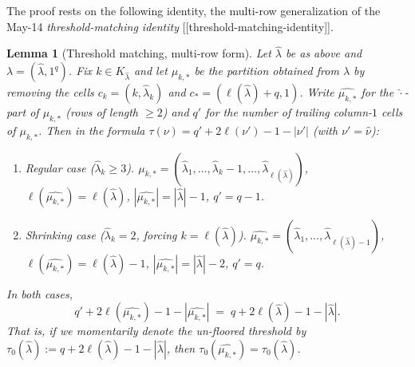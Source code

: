 \documentclass[11pt]{article}
\newtheorem{lemma}[theorem]{Lemma}
\theoremstyle{definition}
\newcommand{\hatl}{\widehat\lambda}
\newcommand{\elh}{\ell(\hatl)}
\begin{document}
The proof rests on the following identity, the multi-row generalization
of the May-14 \emph{threshold-matching identity}
[[threshold-matching-identity]].

\begin{lemma}[Threshold matching, multi-row form]\label{lem:tau-match}
Let $\hatl$ be as above and $\lambda = (\hatl, 1^q)$.
Fix $k \in K_{\hatl}$ and let $\mu_{k,*}$ be the partition obtained from
$\lambda$ by removing the cells $c_k = (k, \hatl_k)$ and
$c_* = (\elh+q, 1)$.  Write
$\widehat{\mu_{k,*}}$ for the $\hat{\cdot}$-part of $\mu_{k,*}$ (rows of
length $\ge 2$) and $q'$ for the number of trailing column-$1$ cells
of $\mu_{k,*}$.  Then in the formula $\tau(\nu) = q' + 2\ell(\nu') - 1 - |\nu'|$
(with $\nu' = \widehat{\nu}$):
\begin{enumerate}[label=(\roman*),topsep=0.2em,itemsep=0.1em]
\item \emph{Regular case ($\hatl_k \ge 3$).}
   $\widehat{\mu_{k,*}} = (\hatl_1, \ldots, \hatl_k - 1, \ldots, \hatl_{\elh})$,
   $\ell(\widehat{\mu_{k,*}}) = \elh$,
   $|\widehat{\mu_{k,*}}| = |\hatl| - 1$, $q' = q - 1$.
\item \emph{Shrinking case ($\hatl_k = 2$, forcing $k = \elh$).}
   $\widehat{\mu_{k,*}} = (\hatl_1, \ldots, \hatl_{\elh - 1})$,
   $\ell(\widehat{\mu_{k,*}}) = \elh - 1$,
   $|\widehat{\mu_{k,*}}| = |\hatl| - 2$, $q' = q$.
\end{enumerate}
In both cases,
\[
   q' + 2\ell(\widehat{\mu_{k,*}}) - 1 - |\widehat{\mu_{k,*}}|
   \;=\; q + 2\elh - 1 - |\hatl|.
\]
That is, if we momentarily denote the
\emph{un-floored} threshold by $\tau_0(\hatl) := q + 2\elh - 1 -
|\hatl|$, then $\tau_0(\widehat{\mu_{k,*}}) = \tau_0(\hatl)$.
\end{lemma}
\end{document}
